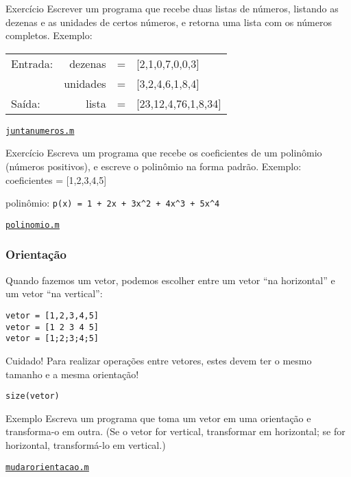 \documentclass[hyperref={pdfpagelabels=false}]{beamer}
\begin{document}
\begin{frame}{Exercício}
		Escrever um programa que recebe duas listas de números, listando as dezenas e as unidades de certos números, e retorna uma lista com os números completos.
    \vfill
    Exemplo:	
 	  \begin{tabular}{l r c l}
 		  Entrada:  & dezenas &=& [2,1,0,7,0,0,3]\\
      & unidades &=& [3,2,4,6,1,8,4]\\
      Saída:   & lista &=& [23,12,4,76,1,8,34]
 	  \end{tabular}

	  \begin{center} \href{listings/juntanumeros.m}{\underline{\texttt{juntanumeros.m}}} \end{center}
\end{frame}

\begin{frame}{Exercício}
  Escreva um programa que recebe os coeficientes de um polinômio (números positivos), e escreve o polinômio na forma padrão. 
  \vfill
	Exemplo: coeficientes = [1,2,3,4,5]
	
	polinômio: {\texttt{p(x) = 1 + 2x + 3x\^{}2 + 4x\^{}3 + 5x\^{}4}}
	
	\begin{center} \href{listings/polinomio.m}{\underline{\texttt{polinomio.m}}} \end{center}
\end{frame}

\begin{frame}\frametitle{Orientação}
   Quando fazemos um vetor, podemos escolher entre um vetor ``na horizontal''
   e um vetor ``na vertical'':

	\begin{center}
		{\texttt{vetor = [1,2,3,4,5]}}\\
		{\texttt{vetor = [1 2 3 4 5]}}\\
		{\texttt{vetor = [1;2;3;4;5]}}
	\end{center}
 
	\begin{alertblock}{Cuidado!}
		Para realizar operações entre vetores, estes devem ter o mesmo tamanho e a mesma orientação!
	\end{alertblock}
	\begin{center} {\texttt{size(vetor)}} \end{center}
\end{frame}

\begin{frame}{Exemplo}
	Escreva um programa que toma um vetor em uma orientação e transforma-o em outra. (Se o vetor for vertical, transformar em horizontal; se for horizontal, transformá-lo em vertical.)
	
	\begin{center} \href{listings/mudarorientacao.m}{\underline{\texttt{mudarorientacao.m}}} \end{center}
	\vfill
\end{frame}
\end{document}
